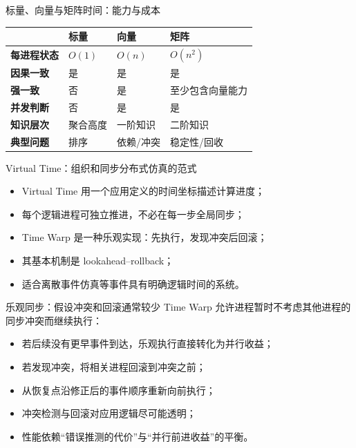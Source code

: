 \documentclass[UTF8,fontset=none,aspectratio=169,10pt]{beamer}
\begin{document}
\begin{frame}{标量、向量与矩阵时间：能力与成本}
\begin{tabularx}{\linewidth}{>{\bfseries}p{2.2cm}XXX}
\toprule
 & 标量 & 向量 & 矩阵 \\
\midrule
每进程状态 & $O(1)$ & $O(n)$ & $O(n^2)$ \\
因果一致 & 是 & 是 & 是 \\
强一致 & 否 & 是 & 至少包含向量能力 \\
并发判断 & 否 & 是 & 是 \\
知识层次 & 聚合高度 & 一阶知识 & 二阶知识 \\
典型问题 & 排序 & 依赖/冲突 & 稳定性/回收 \\
\bottomrule
\end{tabularx}
\vfill
{}
\end{frame}


\begin{frame}{Virtual Time：组织和同步分布式仿真的范式}
\begin{itemize}
  \item Virtual Time 用一个应用定义的时间坐标描述计算进度；
  \item 每个逻辑进程可独立推进，不必在每一步全局同步；
  \item Time Warp 是一种乐观实现：先执行，发现冲突后回滚；
  \item 其基本机制是 lookahead--rollback；
  \item 适合离散事件仿真等事件具有明确逻辑时间的系统。
\end{itemize}
\vfill
{}
\end{frame}

\begin{frame}{乐观同步：假设冲突和回滚通常较少}
Time Warp 允许进程暂时不考虑其他进程的同步冲突而继续执行：
\begin{itemize}
  \item 若后续没有更早事件到达，乐观执行直接转化为并行收益；
  \item 若发现冲突，将相关进程回滚到冲突之前；
  \item 从恢复点沿修正后的事件顺序重新向前执行；
  \item 冲突检测与回滚对应用逻辑尽可能透明；
  \item 性能依赖“错误推测的代价”与“并行前进收益”的平衡。
\end{itemize}
\end{frame}
\end{document}
